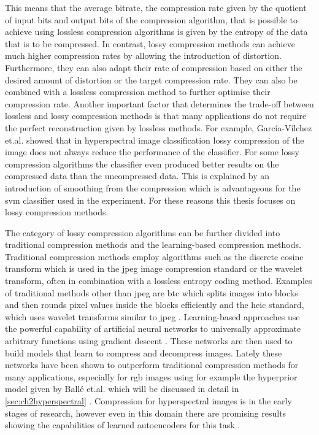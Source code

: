 This means that the average bitrate, the compression rate given by the quotient of input bits and output bits of the compression algorithm, that is possible to achieve using lossless compression algorithms is given by the entropy of the data that is to be compressed.
In contrast, lossy compression methods can achieve much higher compression rates by allowing the introduction of distortion. Furthermore, they can also adapt their rate of compression based on either the desired amount of distortion or the target compression rate. They can also be combined with a lossless compression method to further optimise their compression rate. 
Another important factor that determines the trade-off between lossless and lossy compression methods is that many applications do not require the perfect reconstruction given by lossless methods. For example, García-Vílchez et.al. \citep{garcia-vilchez_impact_2011} showed that in hyperspectral image classification lossy compression of the image does not always reduce the performance of the classifier. For some lossy compression algorithms the classifier even produced better results on the compressed data than the uncompressed data. This is explained by an introduction of smoothing from the compression which is advantageous for the \ac{svm} classifier used in the experiment. 
For these reasons this thesis focuses on lossy compression methods.

The category of lossy compression algorithms can be further divided into traditional compression methods and the learning-based compression methods. Traditional compression methods employ algorithms such as the discrete cosine transform which is used in the \ac{jpeg} image compression standard or the wavelet transform, often in combination with a lossless entropy coding method. Examples of traditional methods other than \ac{jpeg} are \ac{btc} which splits images into blocks and then rounds pixel values inside the blocks efficiently and the \ac{heic} standard, which uses wavelet transforms similar to \ac{jpeg} \citep{delp_image_1979}\citep{hannuksela_high_2015}. Learning-based approaches use the powerful capability of artificial neural networks to universally approximate arbitrary functions using gradient descent \citep{ruder_overview_2017}. These networks are then used to build models that learn to compress and decompress images. Lately these networks have been shown to outperform traditional compression methods for many applications, especially for \ac{rgb} images using for example the hyperprior model given by Ballé et.al. which will be discussed in detail in \autoref{sec:ch2hyperspectral} \citep{balle_end--end_2017}\citep{balle_variational_2018}\citep{minnen_joint_2018}. 
Compression for hyperspectral images is in the early stages of research, however even in this domain there are promising results showing the capabilities of learned autoencoders for this task \citep{kuester_1d-convolutional_2021}\citep{kuester_transferability_2022}\citep{la_grassa_hyperspectral_2022}\citep{guo_learned_2021}.

